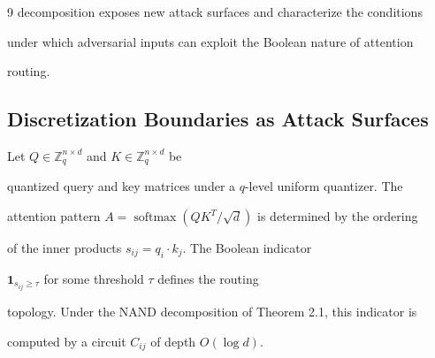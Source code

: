 \documentclass[11pt]{article}
\theoremstyle{definition}
\newcommand{\softmax}{\operatorname{softmax}}
\begin{document}
\begin{thebibliography}{9}
decomposition exposes new attack surfaces and characterize the conditions






under which adversarial inputs can exploit the Boolean nature of attention






routing.













\subsection{Discretization Boundaries as Attack Surfaces}













Let $Q \in \mathbb{Z}_q^{n \times d}$ and $K \in \mathbb{Z}_q^{n \times d}$ be






quantized query and key matrices under a $q$-level uniform quantizer.  The






attention pattern $A = \softmax(QK^T / \sqrt{d})$ is determined by the ordering






of the inner products $s_{ij} = q_i \cdot k_j$.  The Boolean indicator






$\mathbf{1}_{s_{ij} \geq \tau}$ for some threshold $\tau$ defines the routing






topology.  Under the NAND decomposition of Theorem 2.1, this indicator is






computed by a circuit $C_{ij}$ of depth $O(\log d)$.














\end{thebibliography}
\end{document}
